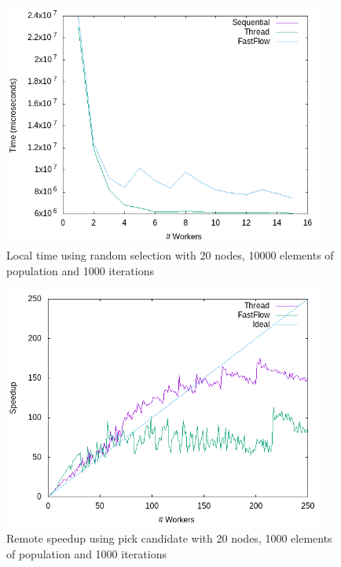 \documentclass{article}
\begin{document}
    \begin{figure}
        \includegraphics[width=\linewidth,height=8cm]{img/local_t_rand.png}
        \caption{Local time using random selection with 20 nodes, 10000 elements of population and 1000 iterations}
        \label{fig:local_time}
    \end{figure}

    \begin{figure}
        \includegraphics[width=\linewidth,height=8cm]{img/remote_s_pick.png}
        \caption{Remote speedup using pick candidate with 20 nodes, 1000 elements of population and 1000 iterations}
        \label{fig:local_speedup}
    \end{figure}
\end{document}
